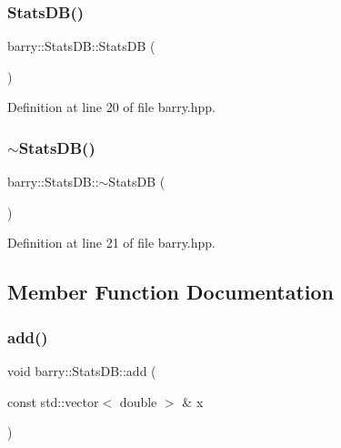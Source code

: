 \subsubsection{\texorpdfstring{Stats\+D\+B()}{StatsDB()}}
{\footnotesize\ttfamily barry\+::\+Stats\+D\+B\+::\+Stats\+DB (\begin{DoxyParamCaption}{ }\end{DoxyParamCaption})\hspace{0.3cm}{\ttfamily [inline]}}



Definition at line 20 of file barry.\+hpp.

\mbox{\label{classbarry_1_1_stats_d_b_a7d511a6eeeae101e18ae47ca616ad204}} 
\subsubsection{\texorpdfstring{$\sim$\+Stats\+D\+B()}{~StatsDB()}}
{\footnotesize\ttfamily barry\+::\+Stats\+D\+B\+::$\sim$\+Stats\+DB (\begin{DoxyParamCaption}{ }\end{DoxyParamCaption})\hspace{0.3cm}{\ttfamily [inline]}}



Definition at line 21 of file barry.\+hpp.



\subsection{Member Function Documentation}
\mbox{\label{classbarry_1_1_stats_d_b_a8f2d22df8ecf8f12bc54157e86d34696}} 
\subsubsection{\texorpdfstring{add()}{add()}}
{\footnotesize\ttfamily void barry\+::\+Stats\+D\+B\+::add (\begin{DoxyParamCaption}\item[{const std\+::vector$<$ double $>$ \&}]{x }\end{DoxyParamCaption})\hspace{0.3cm}{\ttfamily [inline]}}



